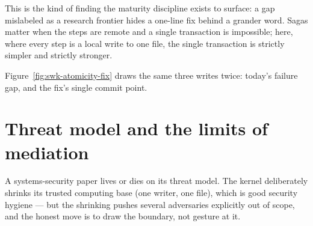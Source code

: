 \documentclass[11pt,a4paper]{article}
\theoremstyle{definition}
\theoremstyle{remark}
\begin{document}

This is the kind of finding the maturity discipline exists to surface: a gap
mislabeled as a research frontier hides a one-line fix behind a grander word.
Sagas matter when the steps are remote and a single transaction is impossible;
here, where every step is a local write to one file, the single transaction is
strictly simpler and strictly stronger.



Figure~\ref{fig:swk-atomicity-fix} draws the same three writes twice: today's
failure gap, and the fix's single commit point.

\pdexercisepointer{\ref{ex:swk-partial-failure}}{\ref{ex:swk-op11-begin-work}}{\pageref{ex:swk-partial-failure}}

\section{Threat model and the limits of mediation}
\label{sec:threatmodel}

A systems-security paper lives or dies on its threat model. The kernel deliberately
shrinks its trusted computing base (one writer, one file), which is good security
hygiene --- but the shrinking pushes several adversaries explicitly out of scope,
and the honest move is to draw the boundary, not gesture at it.
\end{document}
